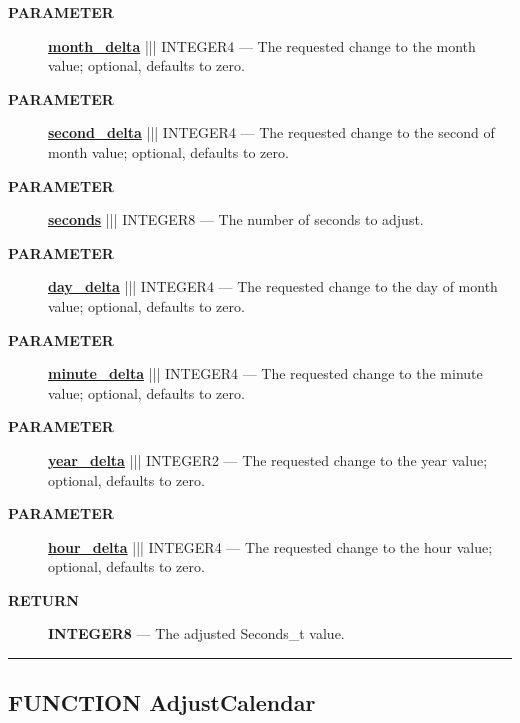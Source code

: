 \par
\begin{description}
\item [\colorbox{tagtype}{\color{white} \textbf{\textsf{PARAMETER}}}] \textbf{\underline{month\_delta}} ||| INTEGER4 --- The requested change to the month value; optional, defaults to zero.
\item [\colorbox{tagtype}{\color{white} \textbf{\textsf{PARAMETER}}}] \textbf{\underline{second\_delta}} ||| INTEGER4 --- The requested change to the second of month value; optional, defaults to zero.
\item [\colorbox{tagtype}{\color{white} \textbf{\textsf{PARAMETER}}}] \textbf{\underline{seconds}} ||| INTEGER8 --- The number of seconds to adjust.
\item [\colorbox{tagtype}{\color{white} \textbf{\textsf{PARAMETER}}}] \textbf{\underline{day\_delta}} ||| INTEGER4 --- The requested change to the day of month value; optional, defaults to zero.
\item [\colorbox{tagtype}{\color{white} \textbf{\textsf{PARAMETER}}}] \textbf{\underline{minute\_delta}} ||| INTEGER4 --- The requested change to the minute value; optional, defaults to zero.
\item [\colorbox{tagtype}{\color{white} \textbf{\textsf{PARAMETER}}}] \textbf{\underline{year\_delta}} ||| INTEGER2 --- The requested change to the year value; optional, defaults to zero.
\item [\colorbox{tagtype}{\color{white} \textbf{\textsf{PARAMETER}}}] \textbf{\underline{hour\_delta}} ||| INTEGER4 --- The requested change to the hour value; optional, defaults to zero.
\end{description}







\par
\begin{description}
\item [\colorbox{tagtype}{\color{white} \textbf{\textsf{RETURN}}}] \textbf{INTEGER8} --- The adjusted Seconds\_t value.
\end{description}




\rule{\linewidth}{0.5pt}
\subsection*{\textsf{\colorbox{headtoc}{\color{white} FUNCTION}
AdjustCalendar}}

